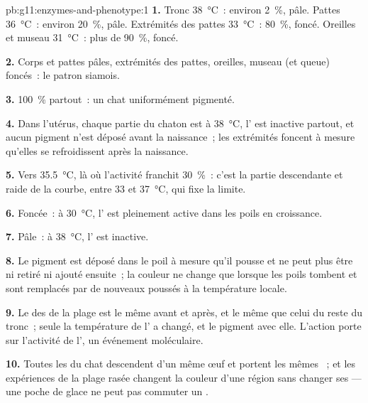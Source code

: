 \begin{solution}{pb:g11:enzymes-and-phenotype:1}
\textbf{1.} Tronc \qty{38}{\celsius}~: environ 2~\%, pâle. Pattes
\qty{36}{\celsius}~: environ 20~\%, pâle. Extrémités des pattes
\qty{33}{\celsius}~: 80~\%, foncé. Oreilles et museau
\qty{31}{\celsius}~: plus de 90~\%, foncé.

\textbf{2.} Corps et pattes pâles, extrémités des pattes, oreilles,
museau (et queue) foncés~: le patron siamois.

\textbf{3.} 100~\% partout~: un chat uniformément pigmenté.

\textbf{4.} Dans l'utérus, chaque partie du chaton est à
\qty{38}{\celsius}, l' est inactive partout, et aucun pigment
n'est déposé avant la naissance~; les extrémités foncent à mesure
qu'elles se refroidissent après la naissance.

\textbf{5.} Vers \qty{35.5}{\celsius}, là où l'activité franchit
30~\%~: c'est la partie descendante et raide de la courbe, entre 33 et
\qty{37}{\celsius}, qui fixe la limite.

\textbf{6.} Foncée~: à \qty{30}{\celsius}, l' est pleinement
active dans les poils en croissance.

\textbf{7.} Pâle~: à \qty{38}{\celsius}, l' est inactive.

\textbf{8.} Le pigment est déposé dans le poil à mesure qu'il pousse et
ne peut plus être ni retiré ni ajouté ensuite~; la couleur ne change
que lorsque les poils tombent et sont remplacés par de nouveaux poussés
à la température locale.

\textbf{9.} Le  des  de la plage est le même avant et
après, et le même que celui du reste du tronc~; seule la température de
l' a changé, et le pigment avec elle. L'action porte sur
l'activité de l', un événement moléculaire.

\textbf{10.} Toutes les  du chat descendent d'un même œuf et
portent les mêmes ~; et les expériences de la plage rasée
changent la couleur d'une région sans changer ses  --- une
poche de glace ne peut pas commuter un .


\end{solution}
